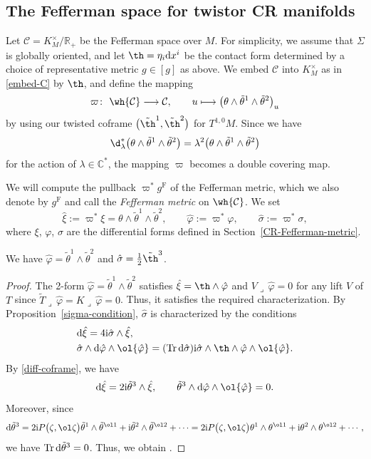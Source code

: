 \subsection{The Fefferman space for twistor CR manifolds}
Let $\mathcal{C}=K_M^\times/\mathbb{R}_+$ be the Fefferman space over $M$. For simplicity, we assume that $\Sigma$ is globally oriented, and let $\th=\eta_i{\rm d}x^i$ be the contact form determined by a choice of representative metric $g\in[g]$ as above.
We embed $\mathcal{C}$ into $K^\times_M$ as in \eqref{embed-C} by $\th$, and define the mapping
\[
\varpi\colon \ \wh{\mathcal{C}}\longrightarrow \mathcal{C}, \qquad u\longmapsto \bigl(\theta\wedge\tilde\theta^1\wedge\tilde\theta^2\bigr)_u
\]
by using our twisted coframe $\bigl(\tilde\th^1, \tilde\th^2\bigr)$ for $T^{1, 0}M$. %
Since we have
\[
\d_\lambda^*\bigl(\theta\wedge\tilde\theta^1\wedge\tilde\theta^2\bigr)
=\lambda^2\bigl(\theta\wedge\tilde\theta^1\wedge\tilde\theta^2\bigr)
\]
for the action of $\lambda\in\mathbb{C}^*$, the mapping $\varpi$ becomes a double covering map.

We will compute the pullback $\varpi^*g^{\mathrm{F}}$ of the Fefferman metric, which we also denote by $g^{\mathrm{F}}$ and call the {\it Fefferman metric} on $\wh{\mathcal{C}}$. We set
\[
\hat{\xi}:=\varpi^*\xi=\theta\wedge\tilde\theta^1\wedge\tilde\theta^2,\qquad \hat{\varphi}:=\varpi^*\varphi, \qquad \hat{\sigma}:=\varpi^*\sigma,
\]
where $\xi$, $\varphi$, $\sigma$ are the differential forms defined in Section~\ref{CR-Fefferman-metric}.
\begin{Lemma}
We have $\hat\varphi=\tilde\theta^1\wedge\tilde\theta^2$ and $\hat\sigma=\frac{1}{2}\tilde\th^3$.
\end{Lemma}
\begin{proof}
The 2-form $\hat\varphi=\tilde\theta^1\wedge\tilde\theta^2$ satisfies
$\hat\xi=\th\wedge\hat\varphi$ and $V\lrcorner\,\hat\varphi=0$ for any lift $V$ of $T$ since $\tilde T\lrcorner\,\hat\varphi= K\lrcorner\,\hat\varphi=0$. Thus, it satisfies the required characterization. By Proposition~\ref{sigma-condition}, $\hat\sigma$ is characterized by the conditions
\begin{align*}
&{\rm d}\hat\xi=4{\rm i}\hat\sigma\wedge\hat\xi, \\
&\hat\sigma\wedge {\rm d}\hat\varphi\wedge\ol{\hat\varphi}=(\operatorname{Tr} {\rm d}\hat\sigma){\rm i}\hat\sigma\wedge\th\wedge\hat\varphi\wedge\ol{\hat\varphi}.
\end{align*}
By \eqref{diff-coframe}, we have
\[
{\rm d}\hat\xi=2{\rm i}\tilde\theta^3\wedge\hat\xi, \qquad
\tilde\theta^3\wedge {\rm d}\hat\varphi\wedge \ol{\hat\varphi}=0.
\]
Moreover, since
\begin{align*}
{\rm d}\tilde\theta^3 =2{\rm i}P\bigl(\zeta, \ol\zeta\bigr)\tilde\theta^1\wedge\tilde\theta^{\ol1}+{\rm i}\tilde\theta^2\wedge\tilde\theta^{\ol2}+\cdots
 =2{\rm i}P\bigl(\zeta, \ol\zeta\bigr)\theta^1\wedge\theta^{\ol1}+{\rm i}\theta^2\wedge\theta^{\ol2}+\cdots,
\end{align*}
we have $\operatorname{Tr}{\rm d}\tilde\theta^3=0$. Thus, we obtain .
\end{proof}

